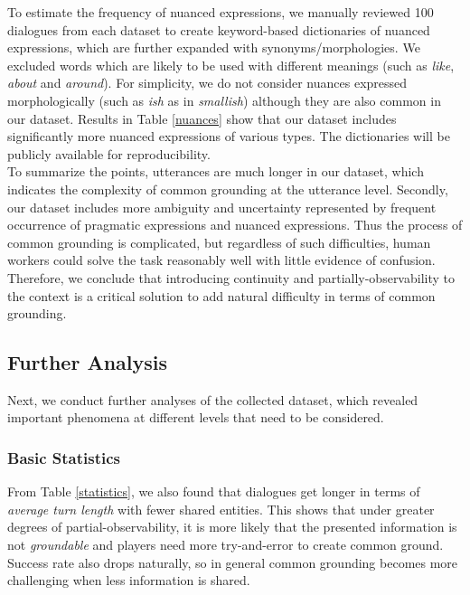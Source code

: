 \documentclass[letterpaper]{article}
\begin{document}
To estimate the frequency of nuanced expressions, we manually reviewed 100 dialogues from each dataset to create keyword-based dictionaries of nuanced expressions, which are further expanded with synonyms/morphologies. We excluded words which are likely to be used with different meanings (such as \textit{like}, \textit{about} and \textit{around}). For simplicity, we do not consider nuances expressed morphologically (such as \textit{ish} as in \textit{smallish}) although they are also common in our dataset. Results in Table \ref{nuances} show that our dataset includes significantly more nuanced expressions of various types. The dictionaries will be publicly available for reproducibility. \\

To summarize the points, utterances are much longer in our dataset, which indicates the complexity of common grounding at the utterance level. Secondly, our dataset includes more ambiguity and uncertainty represented by frequent occurrence of pragmatic expressions and nuanced expressions. Thus the process of common grounding is complicated, but regardless of such difficulties, human workers could solve the task reasonably well with little evidence of confusion. Therefore, we conclude that introducing continuity and partially-observability to the context is a critical solution to add natural difficulty in terms of common grounding.

\subsection{Further Analysis}

Next, we conduct further analyses of the collected dataset, which revealed important phenomena at different levels that need to be considered.

\subsubsection{Basic Statistics}

From Table \ref{statistics}, we also found that dialogues get longer in terms of \emph{average turn length} with fewer shared entities. This shows that under greater degrees of partial-observability, it is more likely that the presented information is not \emph{groundable} and players need more try-and-error to create common ground. Success rate also drops naturally, so in general common grounding becomes more challenging when less information is shared.
\end{document}
